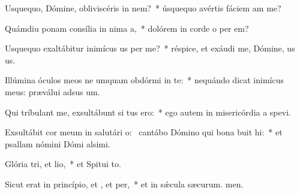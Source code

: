 \item Usquequo, Dómine, obliviscéris  in nem?~* úsquequo avértis fáciem am  me?
\item Quámdiu ponam consília in nima a,~* dolórem in corde o per em?
\item Usquequo exaltábitur inimícus us per me?~* réspice, et exáudi me, Dómine, us us.
\item Illúmina óculos meos ne umquam obdórmi in te:~* nequándo dicat inimícus meus: præválui adsus um.
\item Qui tríbulant me, exsultábunt si tus ero:~* ego autem in misericórdia a spevi.
\item Exsultábit cor meum in salutári o:~\pscross{} cantábo Dómino qui bona buit hi:~* et psallam nómini Dómi alsimi.
\item Glória tri, et lio,~* et Spitui to.
\item Sicut erat in princípio, et , et per,~* et in sǽcula sæcurum. men.
